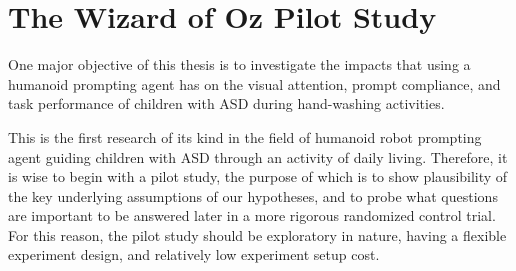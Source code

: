 \chapter{The Wizard of Oz Pilot Study}


One major objective of this thesis is to investigate the impacts that using a humanoid prompting agent has on the visual attention, prompt compliance, and task performance of children with ASD during hand-washing activities.

This is the first research of its kind in the field of humanoid robot prompting agent guiding children with ASD through an activity of daily living.  Therefore, it is wise to begin with a pilot study, the purpose of which is to show plausibility of the key underlying assumptions of our hypotheses, and to probe what questions are important to be answered later in a more rigorous randomized control trial.  For this reason, the pilot study should be exploratory in nature, having a flexible experiment design, and relatively low experiment setup cost.











